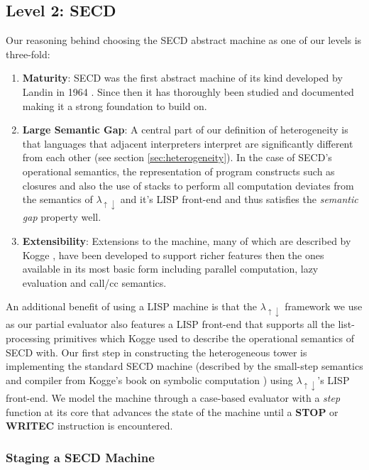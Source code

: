\documentclass[a4paper,12pt,twoside,openright]{report}
\theoremstyle{definition}
\newcommand{\mslang}{$\lambda_{\uparrow\downarrow}$}
\begin{document}
\subsection{Level 2: SECD}\label{sec:secd}
Our reasoning behind choosing the SECD abstract machine as one of our levels is three-fold:
\begin{enumerate}
	\item \textbf{Maturity}: SECD was the first abstract machine of its kind developed by Landin in 1964 \cite{landin1964mechanical}. Since then it has thoroughly been studied and documented \cite{danvy2004rational,ramsdell1999tail,henderson1980functional} making it a strong foundation to build on.
	\item \textbf{Large Semantic Gap}: A central part of our definition of heterogeneity is that languages that adjacent interpreters interpret are significantly different from each other (see section \ref{sec:heterogeneity}). In the case of SECD's operational semantics, the representation of program constructs such as closures and also the use of stacks to perform all computation deviates from the semantics of \mslang{} and it's LISP front-end and thus satisfies the \textit{semantic gap} property well.
	\item \textbf{Extensibility}: Extensions to the machine, many of which are described by Kogge \cite{kogge1990architecture}, have been developed to support richer features then the ones available in its most basic form including parallel computation, lazy evaluation and call/cc semantics.
\end{enumerate}
An additional benefit of using a LISP machine is that the \mslang{} framework we use as our partial evaluator also features a LISP front-end that supports all the list-processing primitives which Kogge used to describe the operational semantics of SECD \cite{kogge1990architecture} with. Our first step in constructing the heterogeneous tower is implementing the standard SECD machine (described by the small-step semantics and compiler from Kogge's book on symbolic computation \cite{kogge1990architecture}) using \mslang's LISP front-end. We model the machine through a case-based evaluator with a \textit{step} function at its core that advances the state of the machine until a \textbf{STOP} or \textbf{WRITEC} instruction is encountered.

\subsubsection{Staging a SECD Machine}\label{subsec:secd_staged}
\end{document}

